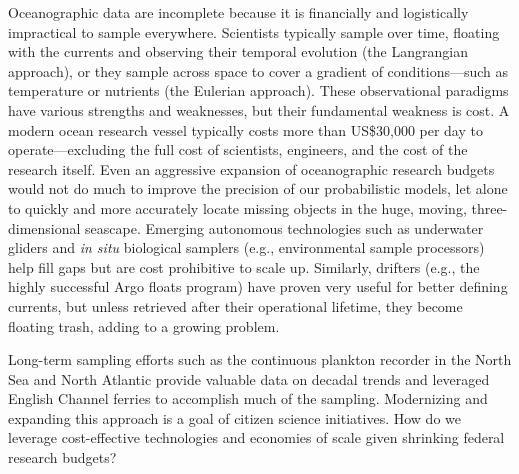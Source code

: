 Oceanographic data are incomplete because it is financially and logistically impractical to sample everywhere. Scientists typically sample over time, floating with the currents and observing their temporal evolution (the Langrangian approach), or they sample across space to cover a gradient of conditions—such as temperature or nutrients (the Eulerian approach). These observational paradigms have various strengths and weaknesses, but their fundamental weakness is cost. A modern ocean research vessel typically costs more than US\$30,000 per day to operate—excluding the full cost of scientists, engineers, and the cost of the research itself. Even an aggressive expansion of oceanographic research budgets would not do much to improve the precision of our probabilistic models, let alone to quickly and more accurately locate missing objects in the huge, moving, three-dimensional seascape. Emerging autonomous technologies such as underwater gliders and {\em in situ} biological samplers (e.g., environmental sample processors) help fill gaps but are cost prohibitive to scale up. Similarly, drifters (e.g., the highly successful Argo floats program) have proven very useful for better defining currents, but unless retrieved after their operational lifetime, they become floating trash, adding to a growing problem.

Long-term sampling efforts such as the continuous plankton recorder in the North Sea and North Atlantic \cite{warner_sampling_1994} provide valuable data on decadal trends and leveraged English Channel ferries to accomplish much of the sampling. Modernizing and expanding this approach is a goal of citizen science initiatives. How do we leverage cost-effective technologies and economies of scale given shrinking federal research budgets?